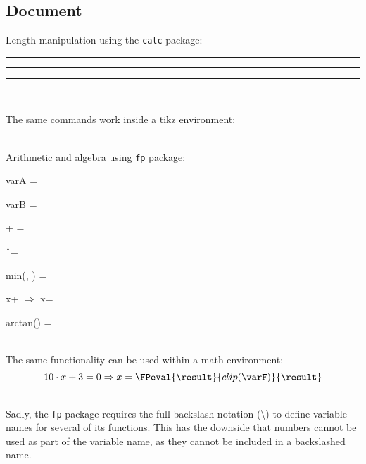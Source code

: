 \documentclass{article}
\newlength{\mylength}
\newlength{\myotherlength}
\newlength{\templength}
\newcommand\FPuse[1]{\FPeval{\result}{#1}{\result}} %
\begin{document}
\subsection*{Document}
\begin{latex}
	Length manipulation using the \verb|calc| package:
	
	\setlength{\mylength}{\textwidth}
	\setlength{\myotherlength}{3cm}
	
	\rule{\mylength}{5pt}
	
	\setlength{\templength}{\mylength-\myotherlength}
	\rule{\templength}{5pt}
	
	\setlength{\templength}{\mylength-\myotherlength*2}
	\rule{\templength}{5pt}
	
	\rule{\templength}{5pt}
	
	~\\
	The same commands work inside a tikz environment:\\
	
	~\\
	Arithmetic and algebra using \verb|fp| package:
	
	varA = \varA
	
	varB = \varB
	
	\varA + \varB = \varC
	
	\varA \^\ \varB = \varD
	
	\FPmin{\varE}{\varA}{\varB}
	min(\varA, \varB) = \varE
	
	\FPlsolve{\varF}{\varA}{\varB}
	\varA*x+ $\Rightarrow$ x=\FPuse{clip(\varF)}
	
	arctan(\varA) = \FPuse{round(\varG,3)}
	
	~\\
	The same functionality can be used within a math environment:
	\begin{equation}
	10\cdot x + 3 = 0 \Rightarrow x=\FPuse{clip(\varF)}
	\end{equation}
	
	~\\
	Sadly, the \verb|fp| package requires the full backslash notation (\textbackslash) to define variable names for several of its functions. This has the downside that numbers cannot be used as part of the variable name, as they cannot be included in a backslashed name.
\end{latex}
\end{document}
